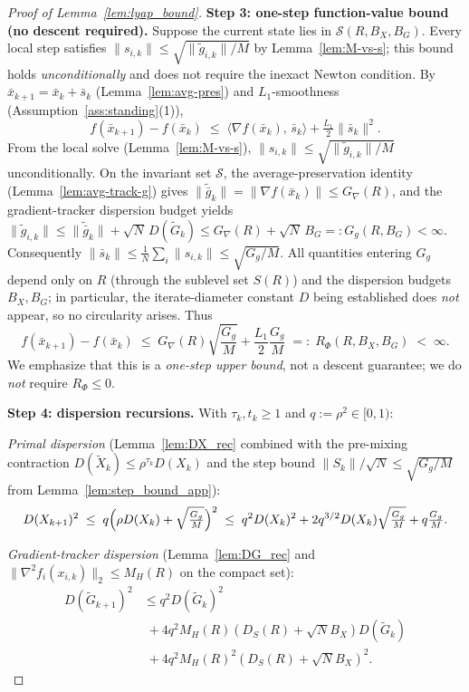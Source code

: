 \documentclass[review,onefignum,onetabnum]{siamart171218}
\begin{document}
\begin{proof}[Proof of Lemma~\ref{lem:lyap_bound}]
\smallskip
\noindent\textbf{Step 3: one-step function-value bound (no descent required).}
Suppose the current state lies in $\mathcal S(R,B_X,B_G)$.
Every local step satisfies $\|s_{i,k}\|\le\sqrt{\|\tilde g_{i,k}\|/M}$
by Lemma~\ref{lem:M-vs-s}; this bound holds \emph{unconditionally}
and does not require the inexact Newton condition.
By $\bar x_{k+1}=\bar x_k+\bar s_k$ (Lemma~\ref{lem:avg-pres}) and
$L_1$-smoothness (Assumption~\ref{ass:standing}(1)),
\[
  f(\bar x_{k+1})-f(\bar x_k)
  \;\le\;
  \langle \nabla f(\bar x_k),\,\bar s_k\rangle
  +\tfrac{L_1}{2}\|\bar s_k\|^2.
\]
From the local solve (Lemma~\ref{lem:M-vs-s}),
$\|s_{i,k}\|\le\sqrt{\|\tilde g_{i,k}\|/M}$ unconditionally.
On the invariant set $\mathcal S$, the average-preservation identity
(Lemma~\ref{lem:avg-track-g}) gives
$\|\tilde{\bar g}_k\|=\|\nabla f(\bar x_k)\|\le G_\nabla(R)$,
and the gradient-tracker dispersion budget yields
$\|\tilde g_{i,k}\|\le \|\tilde{\bar g}_k\|+\sqrt{N}\,D(\tilde G_k)
\le G_\nabla(R)+\sqrt{N}\,B_G=:G_g(R,B_G)<\infty$.
Consequently $\|\bar s_k\|\le\frac{1}{N}\sum_i\|s_{i,k}\|
\le\sqrt{G_g/M}$.
All quantities entering $G_g$ depend only on $R$ (through the
sublevel set $S(R)$) and the dispersion budgets $B_X,B_G$;
in particular, the iterate-diameter constant $D$ being established
does \emph{not} appear, so no circularity arises.
Thus
\begin{equation}\label{eq:rphi_R}
  f(\bar x_{k+1})-f(\bar x_k)
  \;\le\;
  G_\nabla(R)\sqrt{\frac{G_g}{M}}+\frac{L_1}{2}\frac{G_g}{M}
  \;=:\; R_\Phi(R,B_X,B_G) \;<\;\infty.
\end{equation}
We emphasize that this is a \emph{one-step upper bound}, not a descent
guarantee; we do \emph{not} require $R_\Phi\le 0$.

\smallskip
\noindent\textbf{Step 4: dispersion recursions.}
With $\tau_k,t_k\ge1$ and $q:=\rho^2\in[0,1)$:

\emph{Primal dispersion} (Lemma~\ref{lem:DX_rec} combined with the
pre-mixing contraction $D(\tilde X_k)\le \rho^{\tau_k}D(X_k)$ and the
step bound $\|S_k\|/\sqrt{N}\le \sqrt{G_g/M}$ from
Lemma~\ref{lem:step_bound_app}):
\[
  D(X_{k+1})^2
  \;\le\; q\Bigl(\rho D(X_k)+\sqrt{\tfrac{G_g}{M}}\Bigr)^2
  \;\le\; q^2 D(X_k)^2 + 2q^{3/2}D(X_k)\sqrt{\tfrac{G_g}{M}}+q\tfrac{G_g}{M}.
\]

\emph{Gradient-tracker dispersion} (Lemma~\ref{lem:DG_rec}
and $\|\nabla^2 f_i(x_{i,k})\|_2\le M_H(R)$ on the compact set):
\begin{align*}
  D(\tilde G_{k+1})^2
  &\le q^2 D(\tilde G_k)^2\\
  &\;+ 4q^2 M_H(R)(D_S(R){+}\sqrt{N}B_X)D(\tilde G_k)\\
  &\;+ 4q^2 M_H(R)^2(D_S(R){+}\sqrt{N}B_X)^2.
\end{align*}


\end{proof}
\end{document}
